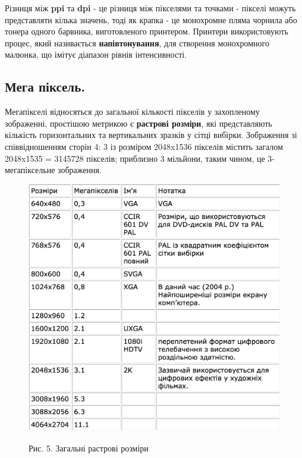 \documentclass[11pt]{article}
\begin{document}
    Різниця між \textbf{ppi} та \textbf{dpi} - це різниця між пікселями та точками - пікселі можуть представляти кілька значень, тоді як крапка - це монохромне пляма чорнила або тонера одного барвника, виготовленого принтером.
    Принтери використовують процес, який називається \textbf{напівтонування}, для створення монохромного малюнка, що імітує діапазон рівнів інтенсивності.

    \subsection{Мега піксель.}\label{subsec:megapixels}
    Мегапікселі відносяться до загальної кількості пікселів у захопленому зображенні, простішою метрикою є \textbf{растрові розміри}, які представляють кількість горизонтальних та вертикальних зразків у сітці вибірки.
    Зображення зі співвідношенням сторін 4: 3 із розміром 2048x1536 пікселів містить загалом 2048x1535 = 3145728 пікселів; приблизно 3 мільйони, таким чином, це 3-мегапіксельне зображення.

    \begin{figure}
        \label{fig:image5}
        \centering
        \includegraphics[scale=0.5]{image5.png}

        Рис. 5. Загальні растрові розміри
    \end{figure}
\end{document}
